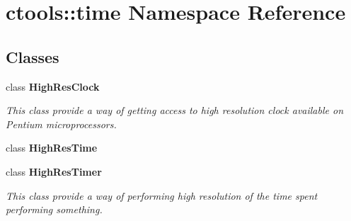 \section{ctools::time Namespace Reference}
\label{namespacectools_1_1time}


\subsection*{Classes}
\begin{CompactItemize}
\item 
class {\bf High\-Res\-Clock}
\begin{CompactList}\small\item\em This class provide a way of getting access to high resolution clock available on Pentium microprocessors. \item\end{CompactList}\item 
class {\bf High\-Res\-Time}
\item 
class {\bf High\-Res\-Timer}
\begin{CompactList}\small\item\em This class provide a way of performing high resolution of the time spent performing something. \item\end{CompactList}\end{CompactItemize}
